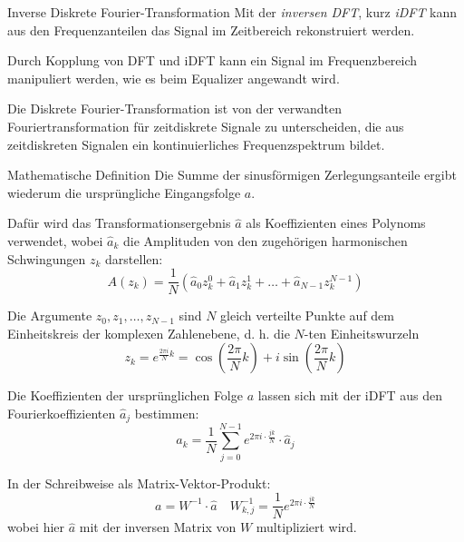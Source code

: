 \begin{defi}{Inverse Diskrete Fourier-Transformation}
    Mit der \emph{inversen DFT}, kurz \emph{iDFT} kann aus den Frequenzanteilen das Signal im Zeitbereich rekonstruiert werden.

    Durch Kopplung von DFT und iDFT kann ein Signal im Frequenzbereich manipuliert werden, wie es beim Equalizer angewandt wird.

    Die Diskrete Fourier-Transformation ist von der verwandten Fouriertransformation für zeitdiskrete Signale zu unterscheiden, die aus zeitdiskreten Signalen ein kontinuierliches Frequenzspektrum bildet.
\end{defi}

\begin{defi}{Mathematische Definition}
    Die Summe der sinusförmigen Zerlegungsanteile ergibt wiederum die ursprüngliche Eingangsfolge $a$.

    Dafür wird das Transformationsergebnis $\hat{a}$ als Koeffizienten eines Polynoms verwendet, wobei $\hat{a}_k$ die Amplituden von den zugehörigen harmonischen Schwingungen $z_k$ darstellen:
    \[
        A(z_{k}) = \frac{1}{N} \left({\hat{a}}_{0}z_{k}^{0}+{\hat {a}}_{1}z_{k}^{1}+\ldots +{\hat {a}}_{N-1}z_{k}^{N-1}\right)
    \]

    Die Argumente $z_0, z_1, \ldots, z_{N-1}$ sind $N$ gleich verteilte Punkte auf dem Einheitskreis der komplexen Zahlenebene, d. h. die $N$-ten Einheitswurzeln
    \[
        z_{k} = e^{{\frac{2\pi i }{N}}k} = \cos \left({\frac{2\pi}{N}}k\right)+i \sin \left({\frac{2\pi}{N}}k\right)
    \]

    Die Koeffizienten der ursprünglichen Folge $a$ lassen sich mit der iDFT aus den Fourierkoeffizienten $\hat{a}_{j}$ bestimmen:
    \[
        a_k = \frac{1}{N} \sum _{j=0}^{N-1} e^{2\pi i \cdot \frac {jk}{N}} \cdot \hat{a}_{j}
    \]

    In der Schreibweise als Matrix-Vektor-Produkt:
    \[
        a = W^{-1} \cdot  \hat{a} \quad W^{-1}_{k, j} = \frac{1}{N} e^{2\pi i \cdot \frac {jk}{N}}
    \]
    wobei hier $\hat {a}$ mit der inversen Matrix von $W$ multipliziert wird.
\end{defi}

